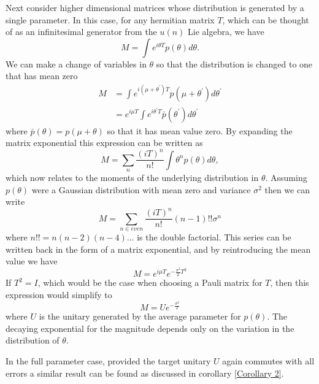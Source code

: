 \documentclass[aps,pra,twocolumn,superscriptaddress,numerical,floatfix]{revtex4-1}
\begin{document}
Next consider higher dimensional matrices whose distribution is generated by a single parameter.  In this case, for any hermitian matrix $T$, which can be thought of as an infinitesimal generator from the $u(n)$ Lie algebra, we have
\begin{equation}
	M=\int e^{i\theta T}p(\theta)d\theta 
	\label{eq:single parameter, multi-mode}.
\end{equation}
We can make a change of variables in $\theta$ so that the distribution is changed to one that has mean zero
\begin{align}
	M&=\int e^{i(\mu + \theta^\prime)T} p(\mu + \theta^\prime) d\theta^\prime\\
	&= e^{i\mu T} \int e^{i\theta^\prime T} \bar{p}(\theta^\prime) d\theta^\prime
\end{align}
where $\bar{p}(\theta) = p(\mu + \theta)$ so that it has mean value zero.  By expanding the matrix exponential this expression can be written as
\begin{equation}
	M=\sum_n \frac{(iT)^n}{n!} \int \theta^n p(\theta) d\theta,
\end{equation}
which now relates to the moments of the underlying distribution in $\theta$. Assuming $p(\theta)$ were a Gaussian distribution with mean zero and variance $\sigma^2$ then we can write
\begin{equation}
	M = \sum_{n \in even} \frac{(iT)^n}{n!} (n-1)!! \sigma^n
\end{equation}
where $n!! = n(n-2)(n-4)\dots$ is the double factorial.  This series can be written back in the form of a matrix exponential, and by reintroducing the mean value we have
\begin{equation}
	M = e^{i\mu T} e^{-\frac{\sigma^2}{2} T^2}
\end{equation}
If $T^2=I$, which would be the case when choosing a Pauli matrix for $T$, then this expression would simplify to
\begin{equation}
M=Ue^{-\frac{\sigma^2}{2}}  \label{eq:Gaussian Psuccess}
\end{equation}
where $U$ is the unitary generated by the average parameter for $p(\theta)$.  The decaying exponential for the magnitude depends only on the variation in the distribution of $\theta$.

In the full parameter case, provided the target unitary $U$ again commutes with all errors a similar result can be found as discussed in corollary \ref{Corollary 2}.
\end{document}
